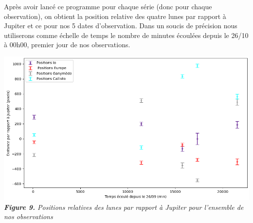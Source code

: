 \documentclass{aa}
\begin{document}
Après avoir lancé ce programme pour chaque série (donc pour chaque observation), on obtient la position relative des quatre lunes par rapport à Jupiter et ce pour nos 5 dates d'observation. 
Dans un soucis de précision nous utiliserons comme échelle de temps le nombre de minutes écoulées depuis le 26/10 à 00h00, premier jour de nos observations.

\begin{center}
\includegraphics[scale = 0.435]{images/positions.PNG}\\
\emph{{\textbf{Figure 9.} Positions relatives des lunes par rapport à Jupiter pour l'ensemble de nos observations}}
\end{center}
\end{document}
